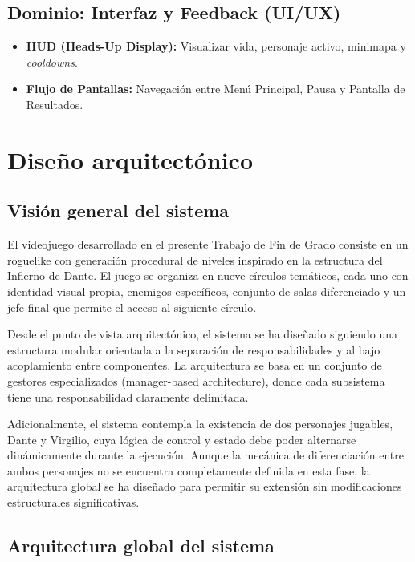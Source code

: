\subsection{Dominio: Interfaz y Feedback (UI/UX)}
\begin{itemize}
    \item \textbf{HUD (Heads-Up Display):} Visualizar vida, personaje activo, 
    minimapa y \textit{cooldowns}.
    \item \textbf{Flujo de Pantallas:} Navegación entre Menú Principal, 
    Pausa y Pantalla de Resultados.
\end{itemize}

\section{Diseño arquitectónico}

\subsection{Visión general del sistema}

El videojuego desarrollado en el presente Trabajo de Fin de Grado consiste en un roguelike con generación procedural de niveles inspirado en la estructura del Infierno de Dante. El juego se organiza en nueve círculos temáticos, cada uno con identidad visual propia, enemigos específicos, conjunto de salas diferenciado y un jefe final que permite el acceso al siguiente círculo.

Desde el punto de vista arquitectónico, el sistema se ha diseñado siguiendo una estructura modular orientada a la separación de responsabilidades y al bajo acoplamiento entre componentes. La arquitectura se basa en un conjunto de gestores especializados (manager-based architecture), donde cada subsistema tiene una responsabilidad claramente delimitada.

Adicionalmente, el sistema contempla la existencia de dos personajes jugables, Dante y Virgilio, cuya lógica de control y estado debe poder alternarse dinámicamente durante la ejecución. Aunque la mecánica de diferenciación entre ambos personajes no se encuentra completamente definida en esta fase, la arquitectura global se ha diseñado para permitir su extensión sin modificaciones estructurales significativas.

\subsection{Arquitectura global del sistema}

